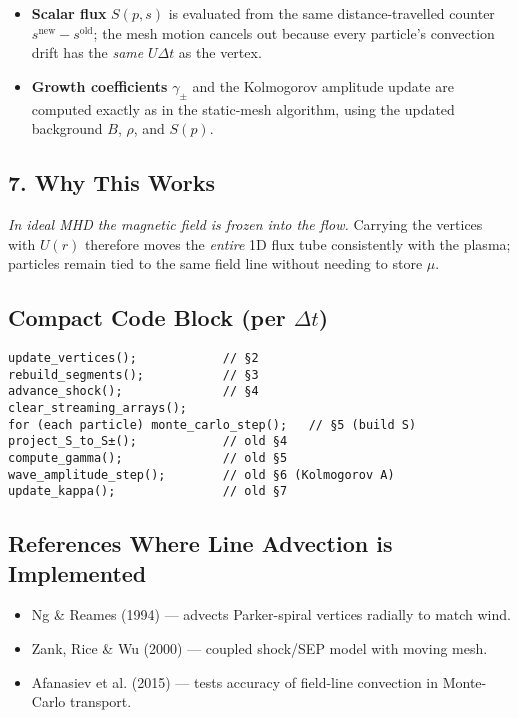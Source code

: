 \begin{itemize}
    \item \textbf{Scalar flux} $S(p,s)$ is evaluated from the same distance-travelled counter
    $s^{\text{new}} - s^{\text{old}}$;
    the mesh motion cancels out because every particle’s convection drift has the \emph{same} $U\Delta t$ as the vertex.
    \item \textbf{Growth coefficients} $\gamma_{\pm}$ and the Kolmogorov amplitude update are computed exactly as in the static-mesh algorithm, using the updated background $B$, $\rho$, and $S(p)$.
\end{itemize}

\subsection*{7. Why This Works}

\emph{In ideal MHD the magnetic field is frozen into the flow.}
Carrying the vertices with $U(r)$ therefore moves the \emph{entire} 1D flux tube consistently with the plasma; particles remain tied to the same field line without needing to store $\mu$.

\subsection*{Compact Code Block (per $\Delta t$)}

\begin{verbatim}
update_vertices();            // §2
rebuild_segments();           // §3
advance_shock();              // §4
clear_streaming_arrays();
for (each particle) monte_carlo_step();   // §5 (build S)
project_S_to_S±();            // old §4
compute_gamma();              // old §5
wave_amplitude_step();        // old §6 (Kolmogorov A)
update_kappa();               // old §7
\end{verbatim}

\subsection*{References Where Line Advection is Implemented}

\begin{itemize}
    \item Ng \& Reames (1994) — advects Parker-spiral vertices radially to match wind.
    \item Zank, Rice \& Wu (2000) — coupled shock/SEP model with moving mesh.
    \item Afanasiev et al. (2015) — tests accuracy of field-line convection in Monte-Carlo transport.
\end{itemize}

